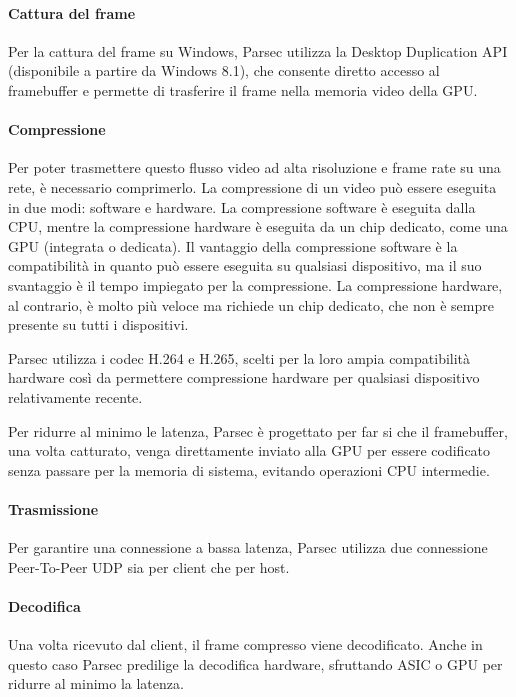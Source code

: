 \documentclass[12pt,a4paper,openright,twoside]{book}
\begin{document}
\paragraph{Cattura del frame}
Per la cattura del frame su Windows, Parsec utilizza la Desktop Duplication API (disponibile a partire da Windows 8.1),
che consente diretto accesso al framebuffer e permette di trasferire il frame nella memoria video della GPU.

\paragraph{Compressione}
\label{sec:compressione}
Per poter trasmettere questo flusso video ad alta risoluzione e frame rate su una rete, è necessario comprimerlo.
La compressione di un video può essere eseguita in due modi: software e hardware.
%
La compressione software è eseguita dalla CPU, mentre la compressione hardware è eseguita da un chip dedicato, come una GPU (integrata o dedicata).
%
Il vantaggio della compressione software è la compatibilità in quanto può essere eseguita su qualsiasi dispositivo, ma il suo svantaggio è il tempo impiegato per la compressione.
La compressione hardware, al contrario, è molto più veloce ma richiede un chip dedicato, che non è sempre presente su tutti i dispositivi.
%

Parsec utilizza i codec H.264 e H.265, scelti per la loro ampia compatibilità hardware così da permettere compressione hardware per qualsiasi dispositivo relativamente recente.

Per ridurre al minimo le latenza, Parsec è progettato per far si che il framebuffer,
una volta catturato, venga direttamente inviato alla GPU per essere codificato senza passare per la memoria di sistema, evitando operazioni CPU intermedie.

\paragraph{Trasmissione}
Per garantire una connessione a bassa latenza, Parsec utilizza due connessione Peer-To-Peer UDP sia per client che per host.

\paragraph{Decodifica}
Una volta ricevuto dal client, il frame compresso viene decodificato. Anche in questo caso Parsec predilige la decodifica hardware, sfruttando ASIC o GPU per ridurre al minimo la latenza.
\end{document}

